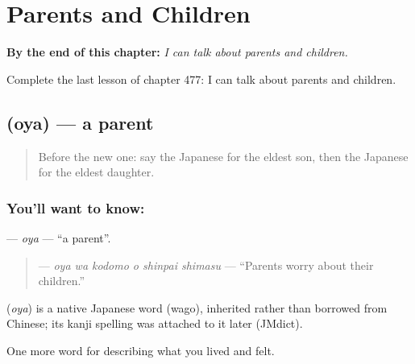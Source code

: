 
\chapter{Parents and Children}
\label{ch:ja-parents-and-children}

\begin{chapteropening}
\textbf{By the end of this chapter:} \emph{I can talk about parents and children.}

Complete the last lesson of chapter 477: I can talk about parents and children.
\end{chapteropening}

\section[\texorpdfstring{\ja{おや} (oya)}{おや (oya)}]{ (oya) — a parent}

\label{lesson:JA-C477-oya}



\begin{quote}
Before the new one: say the Japanese for the eldest son, then the Japanese for the eldest daughter.
\end{quote}

\subsection*{You'll want to know: }
\textbf{} — \emph{oya} — \textquotedblleft{}a parent\textquotedblright{}.

\begin{quote}
\textbf{  } — \emph{oya wa kodomo o shinpai shimasu} — \textquotedblleft{}Parents worry about their children.\textquotedblright{}
\end{quote}

\begin{cousinweb}
\textbf{} (\emph{oya}) is a native Japanese word (wago), inherited rather than borrowed from Chinese; its kanji spelling was attached to it later (JMdict).
\end{cousinweb}

\begin{grammarlens}[title={What you've built}]
One more word for describing what you lived and felt.
\end{grammarlens}

